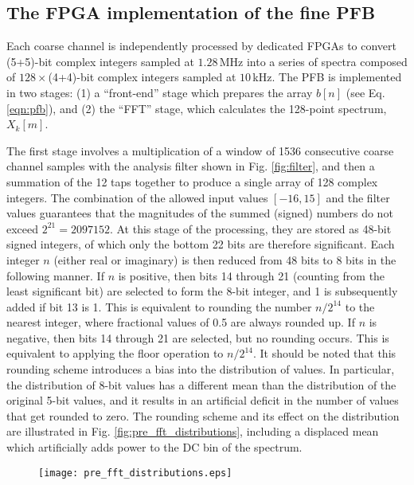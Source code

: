 \documentclass{pasa}%
\begin{document}
\begin{appendix}

\section{The FPGA implementation of the fine PFB}
\label{sec:fpga_pfb}

Each coarse channel is independently processed by dedicated FPGAs to convert (5+5)-bit complex integers sampled at $1.28\,$MHz into a series of spectra composed of $128\times$(4+4)-bit complex integers sampled at $10\,$kHz.
The PFB is implemented in two stages: (1) a ``front-end'' stage which prepares the array $b[n]$ (see Eq. \eqref{eqn:pfb}), and (2) the ``FFT'' stage, which calculates the 128-point spectrum, $X_k[m]$.

The first stage involves a multiplication of a window of 1536 consecutive coarse channel samples with the analysis filter shown in Fig. \ref{fig:filter}, and then a summation of the 12 taps together to produce a single array of 128 complex integers.
The combination of the allowed input values $[-16, 15]$ and the filter values guarantees that the magnitudes of the summed (signed) numbers do not exceed $2^{21} = 2097152$.
At this stage of the processing, they are stored as 48-bit signed integers, of which only the bottom 22 bits are therefore significant.
Each integer $n$ (either real or imaginary) is then reduced from 48 bits to 8 bits in the following manner.
If $n$ is positive, then bits 14 through 21 (counting from the least significant bit) are selected to form the 8-bit integer, and 1 is subsequently added if bit 13 is 1.
This is equivalent to rounding the number $n/2^{14}$ to the nearest integer, where fractional values of 0.5 are always rounded up.
If $n$ is negative, then bits 14 through 21 are selected, but no rounding occurs.
This is equivalent to applying the floor operation to $n/2^{14}$.
It should be noted that this rounding scheme introduces a bias into the distribution of values.
In particular, the distribution of 8-bit values has a different mean than the distribution of the original 5-bit values, and it results in an artificial deficit in the number of values that get rounded to zero.
The rounding scheme and its effect on the distribution are illustrated in Fig. \ref{fig:pre_fft_distributions}, including a displaced mean which artificially adds power to the DC bin of the spectrum.
\begin{figure}[t!]
    \centering
    \texttt{[image: pre\_fft\_distributions.eps]}

\end{figure}
\end{appendix}
\end{document}
